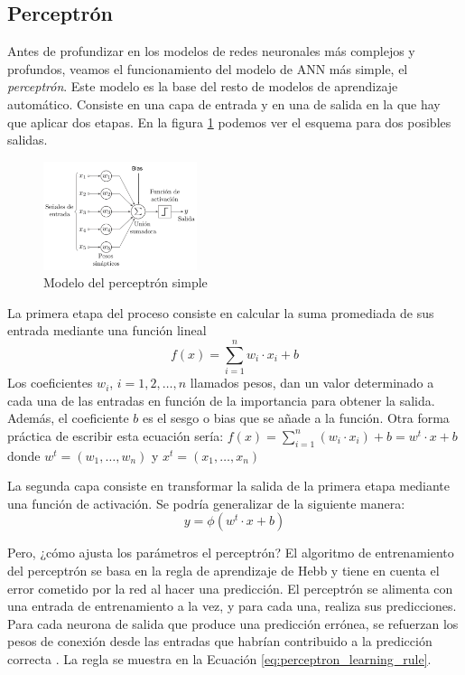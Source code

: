 \subsection{Perceptrón}

Antes de profundizar en los modelos de redes neuronales más complejos y profundos, veamos el funcionamiento del modelo de ANN más simple, el \textit{perceptrón}. Este modelo es la base del resto de modelos de aprendizaje automático. Consiste en una capa de entrada y en una de salida en la que hay que aplicar dos etapas. En la figura \ref{img: perceptron} podemos ver el esquema para dos posibles salidas.

\begin{figure}[h!]
    \centering
    \includegraphics[width=0.4\textwidth]{img/perceptron.png}
    \caption{Modelo del perceptrón simple}
    \label{img: perceptron}
\end{figure}

La primera etapa del proceso consiste en calcular la suma promediada de sus entrada mediante una función lineal
\begin{equation}
f(x) = \sum_{i=1}^{n} w_i \cdot x_i + b
\end{equation}
Los coeficientes $w_i$, $i=1,2, \ldots, n$ llamados pesos, dan un valor determinado a cada una de las entradas en función de la importancia para obtener la salida. Además, el coeficiente $b$ es el sesgo o bias que se añade a la función. Otra forma práctica de escribir esta ecuación sería: $f(x) = \sum_{i=1}^{n} (w_i \cdot x_i) + b= w^t \cdot x + b$  donde $w^t = (w_1, \ldots, w_n)$ y $x^t = (x_1, \ldots, x_n)$

La segunda capa consiste en transformar la salida de la primera etapa mediante una función de activación. Se podría generalizar de la siguiente manera:
\begin{equation}
y = \phi(w^t \cdot x + b)
\end{equation}

Pero, ¿cómo ajusta los parámetros el perceptrón? El algoritmo de entrenamiento del perceptrón se basa en la regla de aprendizaje de Hebb y tiene en cuenta el error cometido por la red al hacer una predicción. El perceptrón se alimenta con una entrada de entrenamiento a la vez, y para cada una, realiza sus predicciones. Para cada neurona de salida que produce una predicción errónea, se refuerzan los pesos de conexión desde las entradas que habrían contribuido a la predicción correcta \citep{geron2022hands}. La regla se muestra en la Ecuación \ref{eq:perceptron_learning_rule}.

